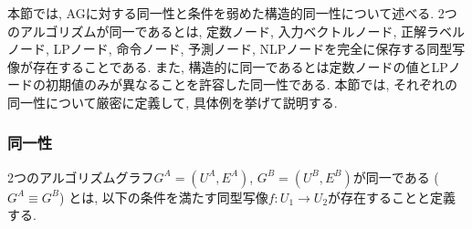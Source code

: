 \documentclass[11pt,oneside,openany,report]{jsbook}
\begin{document}
本節では, AGに対する同一性と条件を弱めた構造的同一性について述べる. 2つのアルゴリズムが同一であるとは, 定数ノード, 入力ベクトルノード, 正解ラベルノード, LPノード, 命令ノード, 予測ノード, NLPノードを完全に保存する同型写像が存在することである. また, 構造的に同一であるとは定数ノードの値とLPノードの初期値のみが異なることを許容した同一性である. 本節では, それぞれの同一性について厳密に定義して, 具体例を挙げて説明する.

\subsubsection{同一性}

2つのアルゴリズムグラフ$G^A = (U^A, E^A)$, $G^B = (U^B, E^B)$が同一である ($G^A \equiv G^B$) とは, 以下の条件を満たす同型写像$ f: U_1 \rightarrow U_2 $が存在することと定義する.
\end{document}
